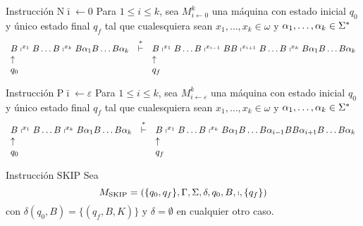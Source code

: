 \begin{frame}
  \begin{block}{Instrucción $\mathrm{N}\bar{\imath} \leftarrow 0$}
    \PN Para $1 \leq i \leq k$, sea $M_{i \leftarrow 0}^{k}$ una máquina con estado inicial $q_{0}$ y único estado final
    $q_{f}$ tal que cualesquiera sean $x_{1}, \dotsc, x_{k} \in \omega$ y $\alpha_{1}, \dotsc, \alpha_{k} \in \Sigma^{\ast}$
    \minLetter
    \[
      \begin{array}{lcl}
        B \shortmid^{x_{1}} B \dotsc B \shortmid^{x_{k}} B \alpha_{1} B \dotsc B \alpha_{k} &\overset{\ast}{\vdash}& B
          \shortmid^{x_{1}} B \dotsc B \shortmid^{x_{i-1}} B B \shortmid^{x_{i+1}} B \dotsc B \shortmid^{x_{k}} B
          \alpha_{1} B \dotsc B \alpha_{k} \\
        \uparrow && \uparrow \\
        q_{0} & & q_{f}
      \end{array}
    \]
  \end{block}

  \begin{block}{Instrucción $\mathrm{P}\bar{\imath} \leftarrow \varepsilon$}
    \PN Para $1 \leq i \leq k$, sea $M_{i \leftarrow \varepsilon}^{k}$ una máquina con estado inicial $q_{0}$ y único
    estado final $q_{f}$ tal que cualesquiera sean $x_{1}, \dotsc, x_{k} \in \omega$ y $\alpha_{1}, \dotsc, \alpha_{k}
    \in \Sigma^{\ast}$
    \minLetter
    \[
      \begin{array}{lcl}
        B \shortmid^{x_{1}} B \dotsc B \shortmid^{x_{k}} B \alpha_{1} B \dotsc B \alpha_{k} &\overset{\ast}{\vdash}& B
          \shortmid^{x_{1}} B \dotsc B \shortmid^{x_{k}} B \alpha_{1} B \dotsc B \alpha_{i-1} B B \alpha_{i+1} B \dotsc
          B \alpha_{k} \\
        \uparrow && \uparrow \\
        q_{0} & & q_{f}
      \end{array}
    \]
  \end{block}

  \begin{block}{Instrucción $\mathrm{SKIP}$}
    \PN Sea
    \begin{equation*}
      M_{\mathrm{SKIP}} = \left(\{q_{0}, q_{f}\}, \Gamma, \Sigma, \delta, q_{0}, B, \shortmid, \{q_{f}\}\right)
    \end{equation*}
    \PN con $\delta(q_{0}, B) = \{(q_{f}, B, K)\}$ y $\delta = \emptyset$ en cualquier otro caso.
  \end{block}
\end{frame}
